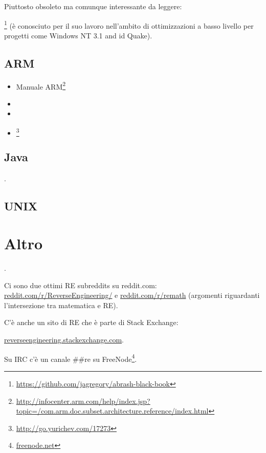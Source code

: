 Piuttosto obsoleto ma comunque interessante da leggere:

\MAbrash\footnote{\AlsoAvailableAs \url{https://github.com/jagregory/abrash-black-book}}
(è conosciuto per il suo lavoro nell'ambito di ottimizzazioni a basso livello per progetti come Windows NT 3.1 and id Quake).

\subsection{ARM}

\begin{itemize}
\item Manuale ARM\footnote{\AlsoAvailableAs \url{http://infocenter.arm.com/help/index.jsp?topic=/com.arm.doc.subset.architecture.reference/index.html}}

\item \ARMSevenRef

\item \ARMSixFourRefURL

\item \ARMCookBook\footnote{\AlsoAvailableAs \url{http://go.yurichev.com/17273}}
\end{itemize}


\subsection{Java}

\JavaBook.

\subsection{UNIX}

\TAOUP



\section{Altro}

\HenryWarren.

Ci sono due ottimi \ac{RE} subreddits su reddit.com:
\href{http://go.yurichev.com/17027}{reddit.com/r/ReverseEngineering/} e
\href{http://go.yurichev.com/17028}{reddit.com/r/remath}
(argomenti riguardanti l'intersezione tra matematica e \ac{RE}).

C'è anche un sito di \ac{RE} che è parte di Stack Exchange:

\par \href{http://go.yurichev.com/17029}{reverseengineering.stackexchange.com}.

Su IRC c'è un canale \#\#re su
FreeNode\footnote{\href{http://go.yurichev.com/17030}{freenode.net}}.

